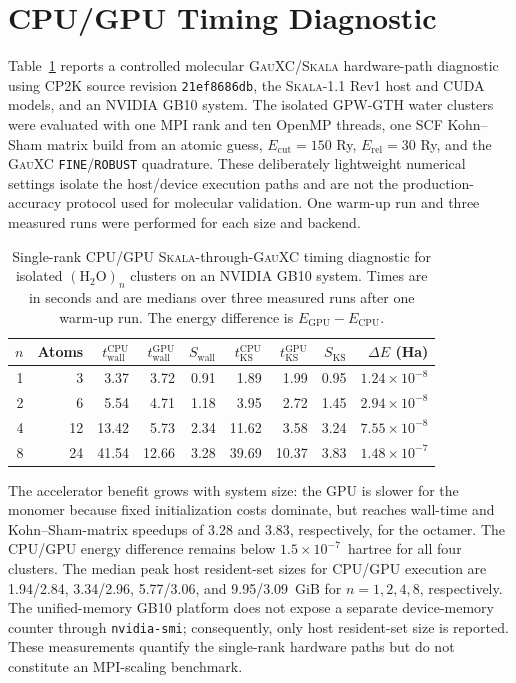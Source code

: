 \documentclass[10pt]{article}
\newcommand{\Skala}{\textsc{Skala}}
\newcommand{\GauXC}{\textsc{GauXC}}
\newcommand{\CPtwoK}{\textsc{CP2K}}
\newcommand{\GPW}{\textsc{GPW}}
\newcommand{\GTH}{\textsc{GTH}}
\newcommand{\GPWGTH}{\GPW{}-\GTH{}}
\newcommand{\SITableFont}{\normalsize}
\begin{document}
\section{{CPU/GPU Timing Diagnostic}}

\begingroup

Table~\ref{tab:si_gpu_timing} reports a controlled molecular \GauXC{}/\Skala{} hardware-path diagnostic using \CPtwoK{} source revision \texttt{21ef8686db}, the \Skala{}-1.1 Rev1 host and CUDA models, and an NVIDIA GB10 system.  The isolated \GPWGTH{} water clusters were evaluated with one MPI rank and ten OpenMP threads, one SCF Kohn--Sham matrix build from an atomic guess, \(E_{\mathrm{cut}}=150\) Ry, \(E_{\mathrm{rel}}=30\) Ry, and the \GauXC{} \texttt{FINE}/\texttt{ROBUST} quadrature.  These deliberately lightweight numerical settings isolate the host/device execution paths and are not the production-accuracy protocol used for molecular validation.  One warm-up run and three measured runs were performed for each size and backend.

\begin{table}[htbp]
\centering
\SITableFont
\setlength{\tabcolsep}{2pt}
\caption{Single-rank CPU/GPU \Skala{}-through-\GauXC{} timing diagnostic for isolated \((\mathrm{H}_2\mathrm{O})_n\) clusters on an NVIDIA GB10 system.  Times are in seconds and are medians over three measured runs after one warm-up run.  The energy difference is \(E_{\mathrm{GPU}}-E_{\mathrm{CPU}}\).}
\label{tab:si_gpu_timing}
\begin{tabular}{@{}rrrrrrrrr@{}}
\hline
\(n\) & Atoms & \(t_{\mathrm{wall}}^{\mathrm{CPU}}\) & \(t_{\mathrm{wall}}^{\mathrm{GPU}}\) & \(S_{\mathrm{wall}}\) & \(t_{\mathrm{KS}}^{\mathrm{CPU}}\) & \(t_{\mathrm{KS}}^{\mathrm{GPU}}\) & \(S_{\mathrm{KS}}\) & \(\Delta E\) (Ha)\\
\hline
1 & 3  & 3.37  & 3.72  & 0.91 & 1.89  & 1.99  & 0.95 & \(1.24{\times}10^{-8}\)\\
2 & 6  & 5.54  & 4.71  & 1.18 & 3.95  & 2.72  & 1.45 & \(2.94{\times}10^{-8}\)\\
4 & 12 & 13.42 & 5.73  & 2.34 & 11.62 & 3.58  & 3.24 & \(7.55{\times}10^{-8}\)\\
8 & 24 & 41.54 & 12.66 & 3.28 & 39.69 & 10.37 & 3.83 & \(1.48{\times}10^{-7}\)\\
\hline
\end{tabular}
\end{table}

The accelerator benefit grows with system size: the GPU is slower for the monomer because fixed initialization costs dominate, but reaches wall-time and Kohn--Sham-matrix speedups of 3.28 and 3.83, respectively, for the octamer.  The CPU/GPU energy difference remains below \(1.5\times10^{-7}\)~hartree for all four clusters.  The median peak host resident-set sizes for CPU/GPU execution are 1.94/2.84, 3.34/2.96, 5.77/3.06, and 9.95/3.09~GiB for \(n=1,2,4,8\), respectively.  The unified-memory GB10 platform does not expose a separate device-memory counter through \texttt{nvidia-smi}; consequently, only host resident-set size is reported.  These measurements quantify the single-rank hardware paths but do not constitute an MPI-scaling benchmark.
\endgroup



\end{document}

